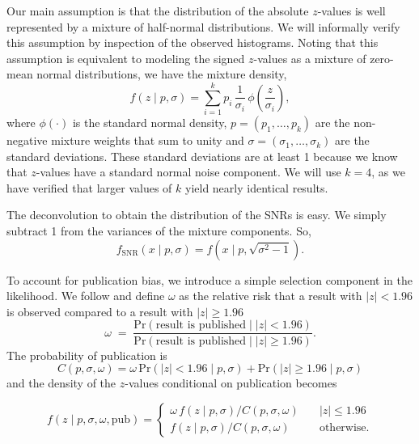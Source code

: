\documentclass[11pt]{article}
\renewcommand{\Pr}{\mathrm{Pr}}
\begin{document}
Our main assumption is that the distribution of the absolute $z$-values is well represented by a mixture of half-normal distributions. We will informally verify this assumption by inspection of the observed histograms. Noting that this assumption is equivalent to modeling the signed $z$-values as a mixture of zero-mean normal distributions, we have the mixture density,
\begin{equation}
f(z \mid p,\sigma) = \sum_{i=1}^{k} p_i\,\frac{1}{\sigma_i}
      \,\phi\!\left(\frac{z}{\sigma_i}\right),                  \label{eq:mixture}
\end{equation}
where $\phi(\cdot)$ is the standard normal density,   $p=(p_1,\dots,p_k)$ are the non-negative mixture weights that sum to unity and  $\sigma=(\sigma_1,\dots,\sigma_k)$ are the standard deviations. These standard deviations are at least 1 because we know that $z$-values have a standard normal noise component. We will use $k=4$, as we have verified that larger values of $k$ yield nearly identical results. 

The deconvolution to obtain the distribution of the SNRs is easy. We simply subtract 1 from the variances of the mixture components. So,
\begin{equation}
f_\text{SNR}(x \mid p,\sigma) = f(x \mid p,\sqrt{\sigma^2 -1}).
\end{equation}

To account for publication bias, we introduce a simple selection component in the likelihood. We follow \textcite{hedges1984estimation,hedges1992modeling} and define $\omega$ as the relative risk that a result with $|z|<1.96$ is observed compared to a result with $|z| \geq 1.96$
\begin{equation}\label{eq:omega}
\omega \;=\;
\frac{\Pr(\text{result is published} \mid |z| <1.96)}
     {\Pr(\text{result is published} \mid |z| \ge1.96)}.
\end{equation}
\noindent
The probability of publication is
\begin{equation}
C(p,\sigma,\omega) = \omega\,\Pr(|z| < 1.96 \mid p,\sigma) + \Pr(|z| \geq 1.96 \mid p,\sigma)
\end{equation}
and the density of the $z$-values conditional on publication becomes

\begin{equation}
f(z \mid p,\sigma, \omega, \text{pub}) = 
\begin{cases}
\omega\,f(z \mid p,\sigma) / C(p,\sigma,\omega) \quad   & |z| \leq 1.96 \\
      f(z \mid p,\sigma)/ C(p,\sigma,\omega)                              & \text{otherwise.}
\end{cases}
\end{equation}
\end{document}
